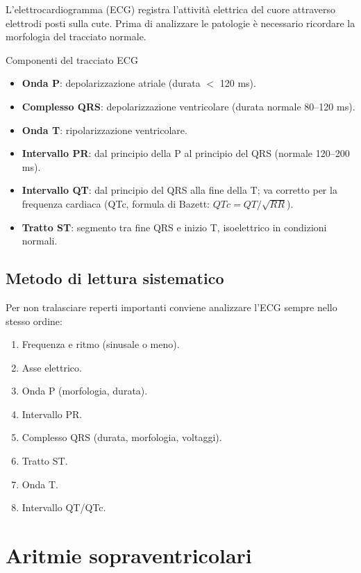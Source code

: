 \documentclass[11pt,a4paper]{article}
\begin{document}
L'elettrocardiogramma (ECG) registra l'attività elettrica del cuore attraverso elettrodi posti sulla cute. Prima di analizzare le patologie è necessario ricordare la morfologia del tracciato normale.

\begin{keybox}{Componenti del tracciato ECG}
\begin{itemize}[leftmargin=1.2em]
  \item \textbf{Onda P}: depolarizzazione atriale (durata $<$ 120 ms).
  \item \textbf{Complesso QRS}: depolarizzazione ventricolare (durata normale 80--120 ms).
  \item \textbf{Onda T}: ripolarizzazione ventricolare.
  \item \textbf{Intervallo PR}: dal principio della P al principio del QRS (normale 120--200 ms).
  \item \textbf{Intervallo QT}: dal principio del QRS alla fine della T; va corretto per la frequenza cardiaca (QTc, formula di Bazett: $QTc = QT/\sqrt{RR}$).
  \item \textbf{Tratto ST}: segmento tra fine QRS e inizio T, isoelettrico in condizioni normali.
\end{itemize}
\end{keybox}

\subsection{Metodo di lettura sistematico}
Per non tralasciare reperti importanti conviene analizzare l'ECG sempre nello stesso ordine:
\begin{enumerate}[leftmargin=1.5em]
  \item Frequenza e ritmo (sinusale o meno).
  \item Asse elettrico.
  \item Onda P (morfologia, durata).
  \item Intervallo PR.
  \item Complesso QRS (durata, morfologia, voltaggi).
  \item Tratto ST.
  \item Onda T.
  \item Intervallo QT/QTc.
\end{enumerate}

\section{Aritmie sopraventricolari}
\end{document}
